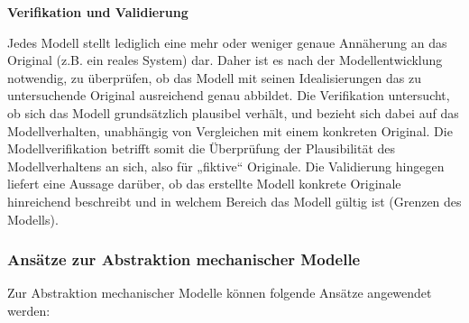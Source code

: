 
\textbf{Verifikation und Validierung}

Jedes Modell stellt lediglich eine mehr oder weniger genaue Annäherung an das Original (z.B. ein reales System) dar. Daher ist es nach der Modellentwicklung notwendig, zu überprüfen, ob das Modell mit seinen Idealisierungen das zu untersuchende Original ausreichend genau abbildet. Die Verifikation untersucht, ob sich das Modell grundsätzlich plausibel verhält, und bezieht sich dabei auf das Modellverhalten, unabhängig von Vergleichen mit einem konkreten Original. Die Modellverifikation betrifft somit die Überprüfung der Plausibilität des Modellverhaltens an sich, also für „fiktive`` Originale. Die Validierung hingegen liefert eine Aussage darüber, ob das erstellte Modell konkrete Originale hinreichend beschreibt und in welchem Bereich das Modell gültig ist (Grenzen des Modells).

\subsubsection{Ansätze zur Abstraktion mechanischer Modelle}

Zur Abstraktion mechanischer Modelle können folgende Ansätze angewendet werden:

